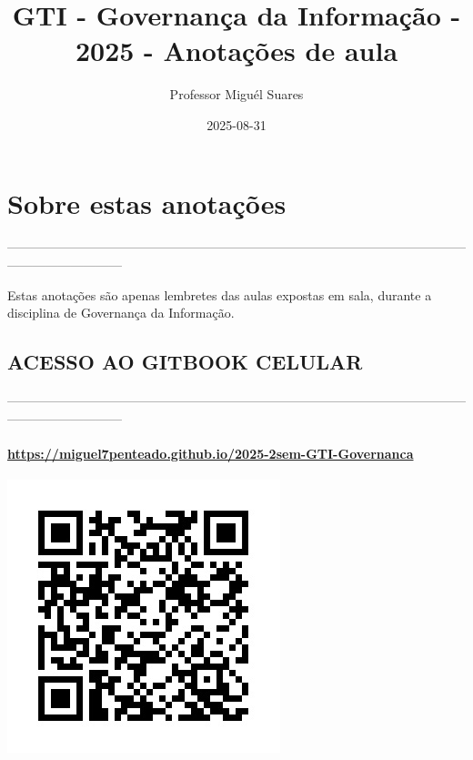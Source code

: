 \documentclass[
]{book}
\title{GTI - Governança da Informação - 2025 - Anotações de aula}
\author{Professor Miguél Suares}
\date{2025-08-31}
\begin{document}
\maketitle

{
\setcounter{tocdepth}{1}
\tableofcontents
}
\chapter*{Sobre estas anotações}\label{sobre-estas-anotauxe7uxf5es}

---------------------------------------------------------------------------------------------------------------------------------------

Estas anotações são apenas lembretes das aulas expostas em sala, durante a disciplina de Governança da Informação.

\section{ACESSO AO GITBOOK CELULAR}\label{acesso-ao-gitbook-celular}

---------------------------------------------------------------------------------------------------------------------------------------

\subsubsection{\texorpdfstring{\url{https://miguel7penteado.github.io/2025-2sem-GTI-Governanca}}{https://miguel7penteado.github.io/2025-2sem-GTI-Governanca}}\label{httpsmiguel7penteado.github.io2025-2sem-gti-governanca}

\includegraphics{images/qr-code-disciplina.jpg}
\end{document}
